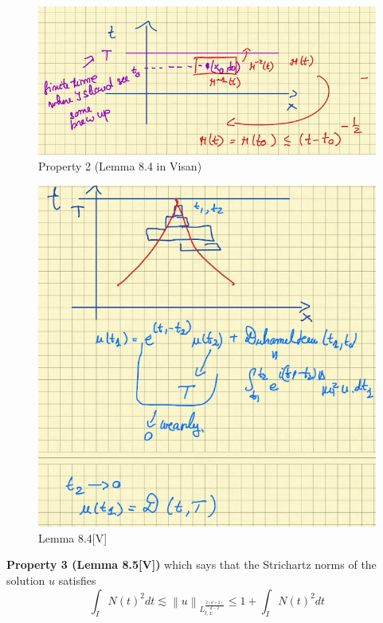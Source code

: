 \documentclass{article}
\newcommand\norm[1]{\left\lVert#1\right\rVert}
\begin{document}
\begin{itemize}
  

 
  \begin{figure}[H]
    \centering \includegraphics[scale=.6]{Visan-Lemma-8.5}
    \caption{Property 2 (Lemma 8.4 in Visan)}
    \label{fig:lem8.5}
  \end{figure}
\end{itemize}

\begin{figure}[H]
  \centering
  \includegraphics[scale=.5,trim={0 12.1cm 2cm 0},clip]{Duhamel-Reduced}
  \caption{Lemma 8.4[V]}
  \label{fig:lem8.4}
\end{figure}

\textbf{Property 3 (Lemma 8.5[V])} which says that the Strichartz norms
of the solution $u$ satisfies
\begin{equation*}
  \int_{I}N(t)^{2} dt  \lesssim \norm{u}_{L_{t,x}^{\frac{2(d+2)}{d-2}}} \leq 1 +\int_{I} N(t)^{2}dt 
\end{equation*}
\end{document}

